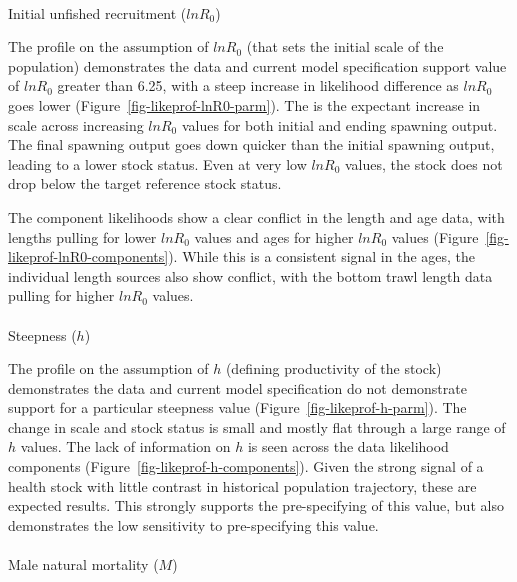 \documentclass[
]{scrartcl}
\makeatletter
\let\oldparagraph\paragraph
\renewcommand{\paragraph}{
    \@ifstar
      \xxxParagraphStar
      \xxxParagraphNoStar
  }
\newcommand{\xxxParagraphStar}[1]{\oldparagraph*{#1}\mbox{}}
\newcommand{\xxxParagraphNoStar}[1]{\oldparagraph{#1}\mbox{}}
\makeatother
\begin{document}
\paragraph{\texorpdfstring{Initial unfished recruitment
(\(lnR_0\))}{Initial unfished recruitment (lnR\_0)}}\label{initial-unfished-recruitment-lnr_0}

The profile on the assumption of \(lnR_0\) (that sets the initial scale
of the population) demonstrates the data and current model specification
support value of \(lnR_0\) greater than 6.25, with a steep increase in
likelihood difference as \(lnR_0\) goes lower
(Figure~\ref{fig-likeprof-lnR0-parm}). The is the expectant increase in
scale across increasing \(lnR_0\) values for both initial and ending
spawning output. The final spawning output goes down quicker than the
initial spawning output, leading to a lower stock status. Even at very
low \(lnR_0\) values, the stock does not drop below the target reference
stock status.

The component likelihoods show a clear conflict in the length and age
data, with lengths pulling for lower \(lnR_0\) values and ages for
higher \(lnR_0\) values (Figure~\ref{fig-likeprof-lnR0-components}).
While this is a consistent signal in the ages, the individual length
sources also show conflict, with the bottom trawl length data pulling
for higher \(lnR_0\) values.

\paragraph{\texorpdfstring{Steepness
(\(h\))}{Steepness (h)}}\label{steepness-h}

The profile on the assumption of \(h\) (defining productivity of the
stock) demonstrates the data and current model specification do not
demonstrate support for a particular steepness value
(Figure~\ref{fig-likeprof-h-parm}). The change in scale and stock status
is small and mostly flat through a large range of \(h\) values. The lack
of information on \(h\) is seen across the data likelihood components
(Figure~\ref{fig-likeprof-h-components}). Given the strong signal of a
health stock with little contrast in historical population trajectory,
these are expected results. This strongly supports the pre-specifying of
this value, but also demonstrates the low sensitivity to pre-specifying
this value.

\paragraph{\texorpdfstring{Male natural mortality
(\(M\))}{Male natural mortality (M)}}\label{male-natural-mortality-m}
\end{document}
